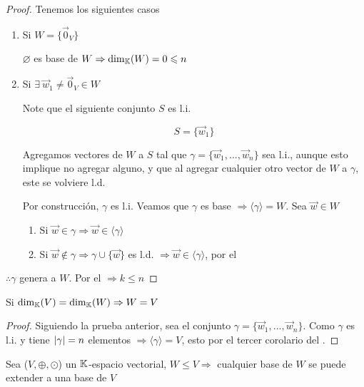 \begin{proof}
    Tenemos los siguientes casos

    \begin{enumerate}
        \item Si $W = \{ \vec{0}_{V} \}$

        $\varnothing$ es base de $W \Rightarrow {\dim}_{\mathbb{K}}(W)  = 0 \leqslant n$

        \item  Si $\exists \: \vec{w}_{1} \neq \vec{0}_{V} \in W$

        Note que el siguiente conjunto $S$ es l.i.

        $$S = \{ \vec{w}_{1} \}$$

        Agregamos vectores de $W$ a $S$ tal que $\gamma = \{ \vec{w}_{1},..., \vec{w}_{n}\}$ sea l.i., aunque esto implique no agregar alguno, y que al agregar cualquier otro vector de $W$ a $\gamma$, este se volviere l.d.
        
        Por construcción, $\gamma$ es l.i. Veamos que $\gamma$ es base $\Rightarrow \langle \gamma \rangle = W$. Sea $\vec{w} \in W$

        \begin{enumerate}
            \item Si $\vec{w} \in \gamma \Rightarrow \vec{w} \in \langle \gamma \rangle$
            \item Si $\vec{w} \notin \gamma \Rightarrow \gamma \cup \{ \vec{w} \}$ es l.d. $\Rightarrow \vec{w} \in \langle \gamma \rangle$, por el 
        \end{enumerate}
    \end{enumerate}

    $\therefore \gamma $ genera a $W$. Por el  $\Rightarrow k \leqslant n$
\end{proof}

\begin{theorem} \label{theomtarea5}
    Si ${\dim}_{\mathbb{K}}(V) = {\dim}_{\mathbb{K}}(W) \Rightarrow W = V$
\end{theorem}

\begin{proof}
    Siguiendo la prueba anterior, sea el conjunto $\gamma = \{ \vec{w}_{1},..., \vec{w}_{n}\}$. Como $\gamma$ es l.i. y tiene $\abs{\gamma} = n$ elementos $\Rightarrow \langle \gamma \rangle = V$, esto por el tercer corolario del .
\end{proof}

\begin{corollary}
    Sea ($V, \oplus, \odot$) un $\mathbb{K}$-espacio vectorial, $W \leq V \Rightarrow $ cualquier base de $W$ se puede extender a una base de $V$
\end{corollary}

